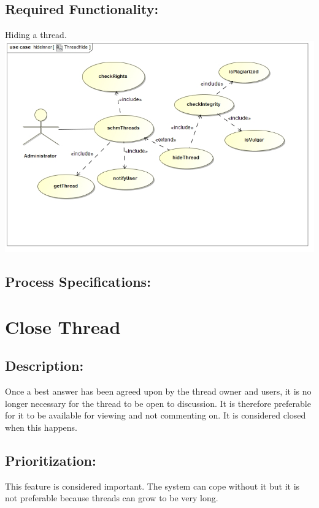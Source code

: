 \documentclass[a4paper,11pt]{article}
\begin{document}
\subsection{Required Functionality:} 
Hiding a thread.\\
\includegraphics[width=1\linewidth]{./Images/SCHMThread/ThreadHide.jpg}\\
\subsection{Process Specifications:} 

\section{Close Thread}
\subsection*{Description:}
Once a best answer has been agreed upon by the thread owner and users, it is no longer necessary for the thread to be open to discussion. It is therefore preferable for it to be available for viewing and not commenting on. It is considered closed when this happens. \\
\subsection{Prioritization:}
This feature is considered important. The system can cope without it but it is not preferable because threads can grow to be very long.\\
\end{document}
